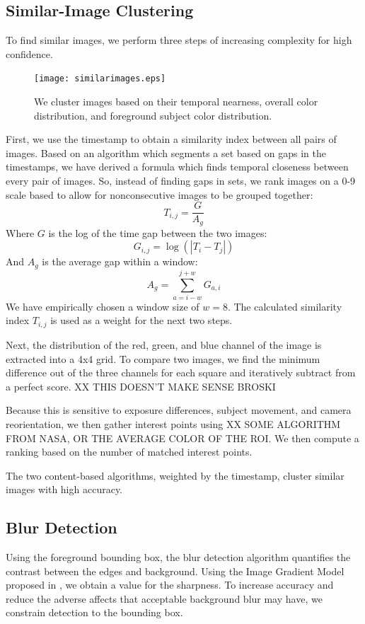 \documentclass[10pt,twocolumn,letterpaper]{article}
\begin{document}
\subsection{Similar-Image Clustering}
To find similar images, we perform three steps of increasing complexity for high confidence.
\begin{figure}[t]
  \centering
    \texttt{[image: similarimages.eps]}
  \caption{We cluster images based on their temporal nearness, overall color distribution, and foreground subject color distribution.}
\end{figure}
First, we use the timestamp to obtain a similarity index between all pairs of images. Based on an algorithm which segments a set based on gaps in the timestamps\cite{1292402}, we have derived a formula which finds temporal closeness between every pair of images. So, instead of finding gaps in sets, we rank images on a 0-9 scale based to allow for nonconsecutive images to be grouped together:
\[
T_{i,j}=\frac{G}{A_g}
\]
Where \(G\) is the log of the time gap between the two images:
\[
G_{i,j}=\log(|T_i-T_j|)
\]
And \(A_g\) is the average gap within a window:
\[
A_g=\displaystyle\sum\limits_{a={i-w}}^{j+w}G_{a,i}
\]
We have empirically chosen a window size of \(w=8\).
The calculated similarity index \(T_{i,j}\) is used as a weight for the next two steps.

Next, the distribution of the red, green, and blue channel of the image is extracted into a 4x4 grid. To compare two images, we find the minimum difference out of the three channels for each square and iteratively subtract from a perfect score. XX THIS DOESN'T MAKE SENSE BROSKI

Because this is sensitive to exposure differences, subject movement, and camera reorientation, we then gather interest points using XX SOME ALGORITHM FROM NASA, OR THE AVERAGE COLOR OF THE ROI. We then compute a ranking based on the number of matched interest points.

The two content-based algorithms, weighted by the timestamp, cluster similar images with high accuracy.

\subsection{Blur Detection}
Using the foreground bounding box, the blur detection algorithm quantifies the contrast between the edges and background. Using the Image Gradient Model proposed in \cite{springerlink:10.1007/978-3-540-77409-9_26}, we obtain a value for the sharpness. To increase accuracy and reduce the adverse affects that acceptable background blur may have, we constrain detection to the bounding box.
\end{document}
